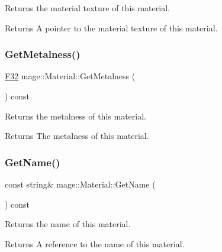 Returns the material texture of this material.

\begin{DoxyReturn}{Returns}
A pointer to the material texture of this material. 
\end{DoxyReturn}
\hypertarget{structmage_1_1_material_a9d91ff9ce999d24558305f070d0cde93}{}\label{structmage_1_1_material_a9d91ff9ce999d24558305f070d0cde93} 
\subsubsection{\texorpdfstring{Get\+Metalness()}{GetMetalness()}}
{\footnotesize\ttfamily \hyperlink{namespacemage_aa97e833b45f06d60a0a9c4fc22ae02c0}{F32} mage\+::\+Material\+::\+Get\+Metalness (\begin{DoxyParamCaption}{ }\end{DoxyParamCaption}) const\hspace{0.3cm}{\ttfamily [noexcept]}}

Returns the metalness of this material.

\begin{DoxyReturn}{Returns}
The metalness of this material. 
\end{DoxyReturn}
\hypertarget{structmage_1_1_material_a9edb2f437eca07c6c12c24d10ec30eb3}{}\label{structmage_1_1_material_a9edb2f437eca07c6c12c24d10ec30eb3} 
\subsubsection{\texorpdfstring{Get\+Name()}{GetName()}}
{\footnotesize\ttfamily const string\& mage\+::\+Material\+::\+Get\+Name (\begin{DoxyParamCaption}{ }\end{DoxyParamCaption}) const\hspace{0.3cm}{\ttfamily [noexcept]}}

Returns the name of this material.

\begin{DoxyReturn}{Returns}
A reference to the name of this material. 
\end{DoxyReturn}
\hypertarget{structmage_1_1_material_a0be98911c56dedaa4fd2f8714fc8a793}{}\label{structmage_1_1_material_a0be98911c56dedaa4fd2f8714fc8a793} 
